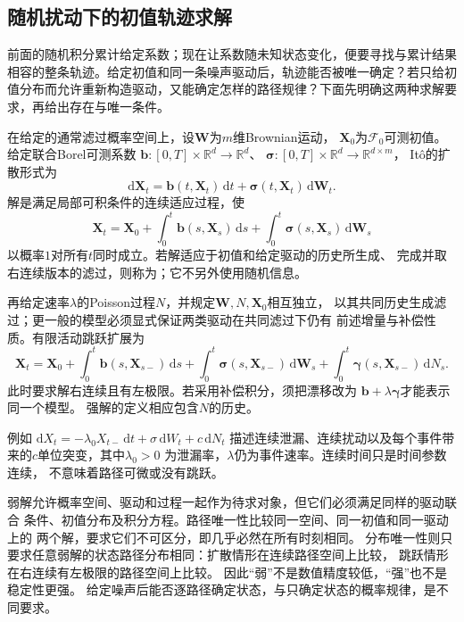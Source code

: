 \subsection{随机扰动下的初值轨迹求解}
\label{sec:action-state-random-trajectory-solve}
前面的随机积分累计给定系数；现在让系数随未知状态变化，便要寻找与累计结果相容的整条轨迹。给定初值和同一条噪声驱动后，轨迹能否被唯一确定？若只给初值分布而允许重新构造驱动，又能确定怎样的路径规律？下面先明确这两种求解要求，再给出存在与唯一条件。

\begin{definition}[Itô随机微分方程与强解]
  \label{def:dynamical-ito-sde-strong-solution}
  在给定的通常滤过概率空间上，设$\bm W$为$m$维Brownian运动，
  $\bm X_0$为$\mathcal F_0$可测初值。给定联合Borel可测系数
  $\bm b:[0,T]\times\mathbb R^d\to\mathbb R^d$、
  $\bm\sigma:[0,T]\times\mathbb R^d\to\mathbb R^{d\times m}$，
  Itô的扩散形式为
  \begin{equation}
    \mathrm d\bm X_t=\bm b(t,\bm X_t)\,\mathrm dt
                  +\bm\sigma(t,\bm X_t)\,\mathrm d\bm W_t.
    \label{eq:dynamical-ito-sde}
  \end{equation}
  解是满足局部可积条件的连续适应过程，使
  \[
    \bm X_t=\bm X_0+\int_0^t\bm b(s,\bm X_s)\,\mathrm ds
                  +\int_0^t\bm\sigma(s,\bm X_s)\,\mathrm d\bm W_s
  \]
  以概率$1$对所有$t$同时成立。若解适应于初值和给定驱动的历史所生成、
  完成并取右连续版本的滤过，则称为；它不另外使用随机信息。
\end{definition}

再给定速率$\lambda$的Poisson过程$N$，并规定$\bm W,N,\bm X_0$相互独立，
以其共同历史生成滤过；更一般的模型必须显式保证两类驱动在共同滤过下仍有
前述增量与补偿性质。有限活动跳跃扩展为
\begin{equation}
 \bm X_t=\bm X_0+\int_0^t\bm b(s,\bm X_{s-})\,\mathrm ds
      +\int_0^t\bm\sigma(s,\bm X_{s-})\,\mathrm d\bm W_s
      +\int_0^t\bm\gamma(s,\bm X_{s-})\,\mathrm dN_s.
 \label{eq:action-state-jump-sde}
\end{equation}
此时要求解右连续且有左极限。若采用补偿积分，须把漂移改为
$\bm b+\lambda\bm\gamma$才能表示同一个模型。
强解的定义相应包含$N$的历史。

例如
$\mathrm dX_t=-\lambda_0X_{t-}\,\mathrm dt+\sigma\,\mathrm dW_t
                         +c\,\mathrm dN_t$
描述连续泄漏、连续扰动以及每个事件带来的$c$单位突变，其中$\lambda_0>0$
为泄漏率，$\lambda$仍为事件速率。连续时间只是时间参数连续，
不意味着路径可微或没有跳跃。

弱解允许概率空间、驱动和过程一起作为待求对象，但它们必须满足同样的驱动联合
条件、初值分布及积分方程。路径唯一性比较同一空间、同一初值和同一驱动上的
两个解，要求它们不可区分，即几乎必然在所有时刻相同。
分布唯一性则只要求任意弱解的状态路径分布相同：扩散情形在连续路径空间上比较，
跳跃情形在右连续有左极限的路径空间上比较。
因此“弱”不是数值精度较低，“强”也不是稳定性更强。
给定噪声后能否逐路径确定状态，与只确定状态的概率规律，是不同要求。

